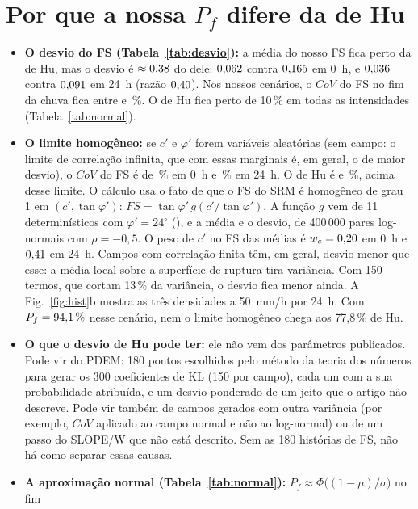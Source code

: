 \documentclass[11pt,a4paper]{article}
\begin{document}
\section{Por que a nossa $P_f$ difere da de Hu}\label{sec:porque}
\begin{itemize}
  \item \textbf{O desvio do FS (Tabela~\ref{tab:desvio}):} a média do nosso FS fica perto da de Hu, mas o desvio é
    $\approx 0{,}38$ do dele: $0{,}062$ contra $0{,}165$ em 0~h, e $0{,}036$ contra $0{,}091$ em 24~h
    (razão $0{,}40$). Nos nossos \nCasos{} cenários, o $CoV$ do FS no fim da chuva fica entre \cvNossoMin{} e
    \cvNossoMax\,\%. O de Hu fica perto de 10\,\% em todas as intensidades (Tabela~\ref{tab:normal}).
  \item \textbf{O limite homogêneo:} se $c'$ e $\varphi'$ forem variáveis aleatórias (sem campo: o limite de
    correlação infinita, que com essas marginais é, em geral, o de maior desvio), o $CoV$ do FS é de \cvHomZero\,\% em 0~h
    e \cvHomVinte\,\% em 24~h. O de Hu é \cvHuZero{} e \cvHuVinte\,\%, acima desse limite. O cálculo usa o fato de que
    o FS do SRM é homogêneo de grau 1 em $(c', \tan\varphi')$: $FS = \tan\varphi'\, g(c'/\tan\varphi')$. A função $g$
    vem de 11 determinísticos com $\varphi' = 24^\circ$ (), e a média e o desvio,
    de 400\,000 pares log-normais com $\rho = -0{,}5$. O peso de $c'$ no FS das médias é $w_c = 0{,}20$ em 0~h e
    $0{,}41$ em 24~h. Campos com correlação finita têm, em geral, desvio menor que esse: a média local
    sobre a superfície de ruptura tira variância. Com 150 termos, que cortam 13\,\% da variância, o desvio fica menor
    ainda. A Fig.~\ref{fig:hist}b mostra as três densidades a 50~mm/h por 24~h. Com
    $P_f = 94{,}1\,\%$ nesse cenário, nem o limite homogêneo chega aos 77,8\,\% de Hu.
  \item \textbf{O que o desvio de Hu pode ter:} ele não vem dos parâmetros publicados. Pode vir do PDEM: 180 pontos
    escolhidos pelo método da teoria dos números para gerar os 300 coeficientes de KL (150 por campo), cada um
    com a sua probabilidade atribuída, e um desvio ponderado de um jeito que o artigo não descreve. Pode vir também de campos gerados com outra variância (por
    exemplo, $CoV$ aplicado ao campo normal e não ao log-normal) ou de um passo do SLOPE/W que não está descrito. Sem as
    180 histórias de FS, não há como separar essas causas.
  \item \textbf{A aproximação normal (Tabela~\ref{tab:normal}):} $P_f \approx \Phi\bigl((1 - \mu)/\sigma\bigr)$ no fim

\end{itemize}
\end{document}
